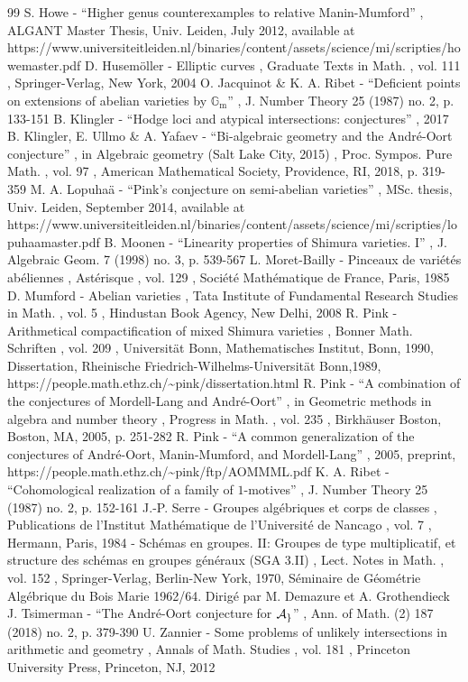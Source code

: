 \documentclass[11pt]{article}
\begin{document}
\begin{thebibliography}{99}
 S. Howe - “Higher genus counterexamples to relative Manin-Mumford” , ALGANT Master Thesis, Univ. Leiden, July 2012, available at https://www.universiteitleiden.nl/binaries/content/assets/science/mi/scripties/howemaster.pdf
 D. Husemöller - Elliptic curves , Graduate Texts in Math. , vol. 111 , Springer-Verlag, New York, 2004
 O. Jacquinot \& K. A. Ribet - “Deficient points on extensions of abelian varieties by $\mathbb{G}_\mathrm{m}$” , J. Number Theory 25 (1987) no. 2, p. 133-151
 B. Klingler - “Hodge loci and atypical intersections: conjectures” , 2017
 B. Klingler, E. Ullmo \& A. Yafaev - “Bi-algebraic geometry and the André-Oort conjecture” , in Algebraic geometry (Salt Lake City, 2015) , Proc. Sympos. Pure Math. , vol. 97 , American Mathematical Society, Providence, RI, 2018, p. 319-359
 M. A. Lopuhaä - “Pink’s conjecture on semi-abelian varieties” , MSc. thesis, Univ. Leiden, September 2014, available at https://www.universiteitleiden.nl/binaries/content/assets/science/mi/scripties/lopuhaamaster.pdf
 B. Moonen - “Linearity properties of Shimura varieties. I” , J. Algebraic Geom. 7 (1998) no. 3, p. 539-567
 L. Moret-Bailly - Pinceaux de variétés abéliennes , Astérisque , vol. 129 , Société Mathématique de France, Paris, 1985
 D. Mumford - Abelian varieties , Tata Institute of Fundamental Research Studies in Math. , vol. 5 , Hindustan Book Agency, New Delhi, 2008
 R. Pink - Arithmetical compactification of mixed Shimura varieties , Bonner Math. Schriften , vol. 209 , Universität Bonn, Mathematisches Institut, Bonn, 1990, Dissertation, Rheinische Friedrich-Wilhelms-Universität Bonn,1989, https://people.math.ethz.ch/\textasciitilde{}pink/dissertation.html
 R. Pink - “A combination of the conjectures of Mordell-Lang and André-Oort” , in Geometric methods in algebra and number theory , Progress in Math. , vol. 235 , Birkhäuser Boston, Boston, MA, 2005, p. 251-282
 R. Pink - “A common generalization of the conjectures of André-Oort, Manin-Mumford, and Mordell-Lang” , 2005, preprint, https://people.math.ethz.ch/\textasciitilde{}pink/ftp/AOMMML.pdf
 K. A. Ribet - “Cohomological realization of a family of $1$-motives” , J. Number Theory 25 (1987) no. 2, p. 152-161
 J.-P. Serre - Groupes algébriques et corps de classes , Publications de l’Institut Mathématique de l’Université de Nancago , vol. 7 , Hermann, Paris, 1984
 - Schémas en groupes. II: Groupes de type multiplicatif, et structure des schémas en groupes généraux (SGA 3.II) , Lect. Notes in Math. , vol. 152 , Springer-Verlag, Berlin-New York, 1970, Séminaire de Géométrie Algébrique du Bois Marie 1962/64. Dirigé par M. Demazure et A. Grothendieck
 J. Tsimerman - “The André-Oort conjecture for $\cal A_g$” , Ann. of Math. (2) 187 (2018) no. 2, p. 379-390
 U. Zannier - Some problems of unlikely intersections in arithmetic and geometry , Annals of Math. Studies , vol. 181 , Princeton University Press, Princeton, NJ, 2012
\end{thebibliography}
\end{document}

